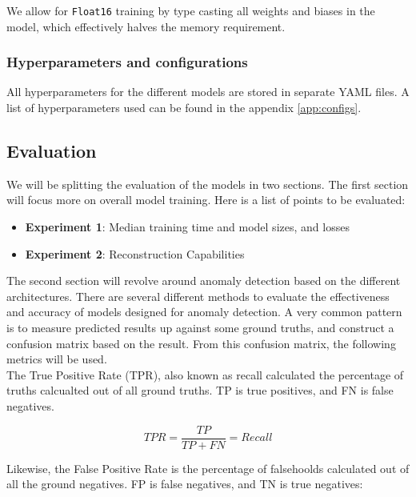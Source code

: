 

We allow for \texttt{Float16} training by type casting all weights and biases in the model, which effectively halves the memory requirement.

\subsubsection{Hyperparameters and configurations}

All hyperparameters for the different models are stored in separate YAML files. A list of hyperparameters used can be found in the appendix \ref{app:configs}.

\subsection{Evaluation}

We will be splitting the evaluation of the models in two sections. The first section will focus more on overall model training. Here is a list of points to be evaluated: 

\begin{itemize}
    \item \textbf{Experiment 1}: Median training time and model sizes, and losses
    \item \textbf{Experiment 2}: Reconstruction Capabilities
\end{itemize}

The second section will revolve around anomaly detection based on the different architectures. There are several different methods to evaluate the effectiveness and accuracy of models designed for anomaly detection. A very common pattern is to measure predicted results up against some ground truths, and construct a confusion matrix based on the result. From this confusion matrix, the following metrics will be used. \\ 

The True Positive Rate (TPR), also known as recall calculated the percentage of truths calcualted out of all ground truths. TP is true positives, and FN is false negatives. 

\begin{equation}
    TPR = \frac{TP}{TP + FN} = Recall
\end{equation}

Likewise, the False Positive Rate is the percentage of falsehoolds calculated out of all the ground negatives. FP is false negatives, and TN is true negatives:

